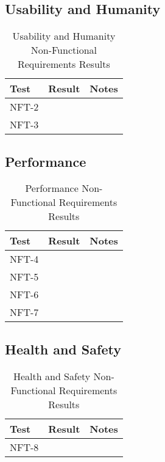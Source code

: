 \documentclass[12pt, titlepage]{article}
\begin{document}
\subsection{Usability and Humanity}

\begin{table}[H]
\centering
    \setlength{\leftmargini}{0.4cm}
    \begin{tabular}{| >{\centering\arraybackslash}m{3cm} | 
      >{\centering\arraybackslash}m{4cm} | 
      >{\centering\arraybackslash}m{6cm} |}
    \hline
    \rowcolor[gray]{0.9}
    Test & Result & Notes\\
    \hline
    NFT-2 &  & \\
    \hline
    NFT-3 &  & \\
    \hline
    \end{tabular}
\caption{Usability and Humanity Non-Functional Requirements Results}
\end{table}

\subsection{Performance}

\begin{table}[H]
\centering
    \setlength{\leftmargini}{0.4cm}
    \begin{tabular}{| >{\centering\arraybackslash}m{3cm} | 
      >{\centering\arraybackslash}m{4cm} | 
      >{\centering\arraybackslash}m{6cm} |}
    \hline
    \rowcolor[gray]{0.9}
    Test & Result & Notes\\
    \hline
    NFT-4 &  & \\
    \hline
    NFT-5 &  & \\
    \hline
    NFT-6 &  & \\
    \hline
    NFT-7 &  & \\
    \hline
    \end{tabular}
\caption{Performance Non-Functional Requirements Results}
\end{table}

\subsection{Health and Safety}

\begin{table}[H]
\centering
    \setlength{\leftmargini}{0.4cm}
    \begin{tabular}{| >{\centering\arraybackslash}m{3cm} | 
      >{\centering\arraybackslash}m{4cm} | 
      >{\centering\arraybackslash}m{6cm} |}
    \hline
    \rowcolor[gray]{0.9}
    Test & Result & Notes\\
    \hline
    NFT-8 &  & \\
    \hline
    \end{tabular}
\caption{Health and Safety Non-Functional Requirements Results}
\end{table}
\end{document}
